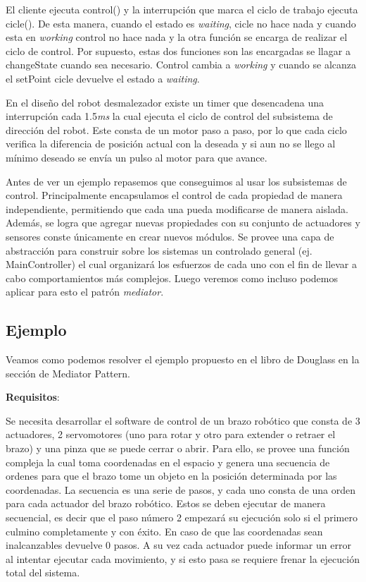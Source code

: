 El cliente ejecuta control() y la interrupción que marca el ciclo de trabajo ejecuta cicle(). De esta manera, cuando el estado es \textit{waiting}, cicle no hace nada y cuando esta en \textit{working} control no hace nada y la otra función se encarga de realizar el ciclo de control.
Por supuesto, estas dos funciones son las encargadas se llagar a changeState cuando sea necesario. Control cambia a \textit{working} y cuando se alcanza el setPoint cicle devuelve el estado a \textit{waiting}.

En el diseño del robot desmalezador existe un timer que desencadena una interrupción cada 1.5\textit{ms} la cual ejecuta el ciclo de control del subsistema de dirección del robot. Este consta de un motor paso a paso, por lo que cada ciclo verifica la diferencia de posición actual con la deseada y si aun no se llego al mínimo deseado se envía un pulso al motor para que avance.

Antes de ver un ejemplo repasemos que conseguimos al usar los subsistemas de control. Principalmente encapsulamos el control de cada propiedad de manera independiente, permitiendo que cada una pueda modificarse de manera aislada. Además, se logra que agregar nuevas propiedades con su conjunto de actuadores y sensores conste únicamente en crear nuevos módulos. Se provee una capa de abstracción para construir sobre los sistemas un controlado general (ej. MainController) el cual organizará los esfuerzos de cada uno con el fin de llevar a cabo comportamientos más complejos. Luego veremos como incluso podemos aplicar para esto el patrón \textit{mediator}.

\subsection{Ejemplo}

Veamos como podemos resolver el ejemplo propuesto en el libro de Douglass en la sección de Mediator Pattern.

\textbf{Requisitos}:

Se necesita desarrollar el software de control de un brazo robótico que consta de 3 actuadores, 2 
servomotores (uno para rotar y otro para extender o retraer el brazo) y una pinza que se puede cerrar o abrir. Para ello, se provee una función compleja la cual toma coordenadas en el espacio y genera una secuencia de ordenes para que el brazo tome un objeto en la posición determinada por las coordenadas. La secuencia es una serie de pasos, y cada uno consta de una orden para cada actuador del brazo robótico. Estos se deben ejecutar de manera secuencial, es decir que el paso número 2 empezará su ejecución solo si el primero culmino completamente y con éxito. En caso de que las coordenadas sean inalcanzables devuelve 0 pasos. A su vez cada actuador puede informar un error al intentar ejecutar cada movimiento, y si esto pasa se requiere frenar la ejecución total del sistema.


